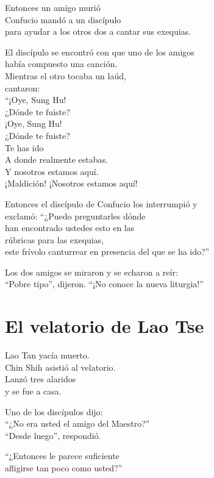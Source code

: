 \documentclass[book,b5paper,hidelinks,final]{memoir}
\begin{document}
	Entonces un amigo murió\\
	Confucio mandó a un discípulo\\
	para ayudar a los otros dos a cantar sus exequias.
	
	El discípulo se encontró con que uno de los amigos\\
	había compuesto una canción.\\
	Mientras el otro tocaba un laúd,\\
	cantaron:\\
	``¡Oye, Sung Hu!\\
	¿Dónde te fuiste?\\
	¡Oye, Sung Hu!\\
	¿Dónde te fuiste?\\
	Te has ido\\
	A donde realmente estabas.\\
	Y nosotros estamos aquí.\\
	¡Maldición! ¡Nosotros estamos aquí!
	
	Entonces el discípulo de Confucio los interrumpió y\\
	exclamó: ``¿Puedo preguntarles dónde\\
	han encontrado ustedes esto en las\\
	rúbricas para las exequias,\\
	este frívolo canturrear en presencia del que se ha ido?''
	
	Los dos amigos se miraron y se echaron a reír:\\
	``Pobre tipo'', dijeron. ``¡No conoce la nueva liturgia!''
	
	\chapter*{El velatorio de Lao Tse}
	
	Lao Tan yacía muerto.\\
	Chin Shih asistió al velatorio.\\
	Lanzó tres alaridos\\
	y se fue a casa.
	
	Uno de los discípulos dijo:\\
	``¿No era usted el amigo del Maestro?''\\
	``Desde luego'', respondió.
	
	``¿Entonces le parece suficiente\\
	afligirse tan poco como usted?''
	
\end{document}

